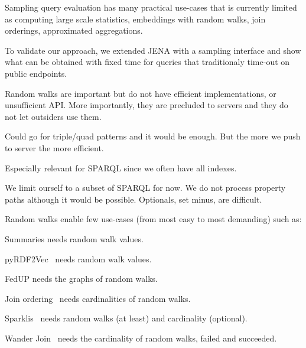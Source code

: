 Sampling query evaluation has many practical use-cases that is
currently limited as computing
large scale statistics\cite{soulet2019anytime}, embeddings with random
walks\cite{ristoski2016rdf2vec}, join
orderings\cite{DBLP:conf/cidr/LeisRGK017}, approximated
aggregations\cite{DBLP:journals/tods/LiWYZ19}.




To validate our
approach, we extended JENA with a sampling interface and show what can
be obtained with fixed time for queries that traditionaly time-out on
public endpoints.




Random walks are important but do not have efficient implementations,
or unsufficient API. More importantly, they are precluded to servers
and they do not let outsiders use them.

Could go for triple/quad patterns and it would be enough. But the more
we push to server the more efficient.

Especially relevant for SPARQL since we often have all indexes.

We limit ourself to a subset of SPARQL for now. We do not process
property paths although it would be possible. Optionals, set minus, are
difficult.


Random walks enable few use-cases (from most easy to most demanding)
such as:
\begin{asparadesc}
\item [Summaries] needs random walk values.
\item [pyRDF2Vec~\cite{steenwinckel2023pyrdf2vec}] needs random walk values.
\item [FedUP] needs the graphs of random walks.
\item [Join ordering~\REF] needs cardinalities of random walks.
\item [Sparklis~\cite{ferre2017sparklis}] needs random walks (at
  least) and cardinality (optional).
\item [Wander Join~\cite{li2016wanderjoin}] needs the cardinality of
  random walks, failed and succeeded.
\end{asparadesc}

